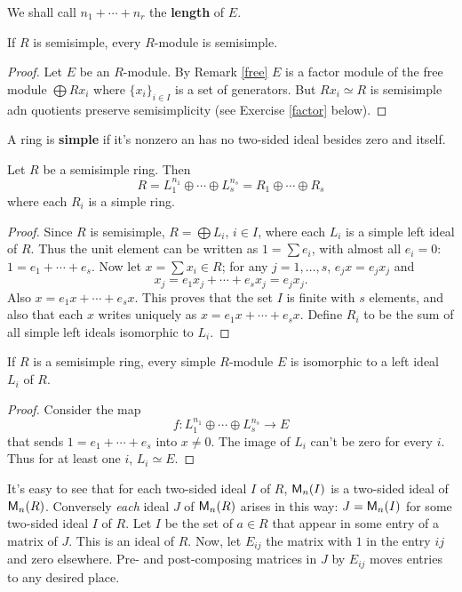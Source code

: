 We shall call $n_1 + \cdots + n_r$ the \textbf{length} of $E$. 

\begin{lem}
If $R$ is semisimple, every $R$-module is semisimple. 
\begin{proof}
Let $E$ be an $R$-module. By Remark \ref{free} $E$ is a factor module of the free module $\bigoplus Rx_i$ where $\{x_i\}_{i \in I}$ is a set of generators. 
But $Rx_i \simeq R$ is semisimple adn quotients preserve semisimplicity (see Exercise \ref{factor} below). 
\end{proof}
\end{lem}

A ring is \textbf{simple} if it's nonzero an has no two-sided ideal besides zero and itself.

\begin{thm} Let $R$ be a semisimple ring. Then 
$$R=L_1 ^{n_1} \oplus \cdots \oplus L_s ^{n_s} = R_1 \oplus \cdots \oplus R_s$$
where each $R_i$ is a simple ring. 
\begin{proof}
Since $R$ is semisimple, $R=\bigoplus L_i$, $i \in I$, where each $L_i$ is a simple left ideal of $R$.
Thus the unit element can be written as $1=\sum e_i$, with almost all $e_i=0$: $1=e_1 + \cdots + e_s\text{.}$ 
Now let $x=\sum x_i \in R$; for any $j=1,\ldots,s$, $e_j x=e_j x_j $ and 
$$x_j = e_1 x_j + \cdots + e_s x_j=e_j x_j\text{.}$$ 
Also $x=e_1 x + \cdots + e_s x$. 
This proves that the set $I$ is finite with $s$ elements, and also that each $x$ writes uniquely as $x=e_1 x + \cdots + e_s x$. 
Define $R_i$ to be the sum of all simple left ideals isomorphic to $L_i$.
\end{proof}
\end{thm} 

\begin{cor}
If $R$ is a semisimple ring, every simple $R$-module $E$ is isomorphic to a left ideal $L_i$ of $R$.
\begin{proof}
Consider the map 
$$f: L_1 ^{n_1} \oplus \cdots \oplus L_s ^{n_s} \to E$$ 
that sends $1=e_1 + \cdots +e_s$ into $x \neq 0$.
The image of $L_i$ can't be zero for every $i$.
Thus for at least one $i$, $L_i \simeq  E$.
\end{proof}
\end{cor}
 
It's easy to see that for each two-sided ideal $I$ of $R$, $\operatorname{\sf{M}}_n(I)$ is a two-sided ideal of $\operatorname{\sf{M}}_n(R)$. 
Conversely \textit{each} ideal $J$ of $\operatorname{\sf{M}}_n(R)$ arises in this way: $J=\operatorname{\sf{M}}_n(I)$ for some two-sided ideal $I$ of $R$. 
Let $I$ be the set of $a \in R$ that appear in some entry of a matrix of $J$. 
This is an ideal of $R$. 
Now, let $E_{ij}$ the matrix with $1$ in the entry $ij$ and zero elsewhere. 
Pre- and post-composing matrices in $J$ by $E_{ij}$ moves entries to any desired place.

